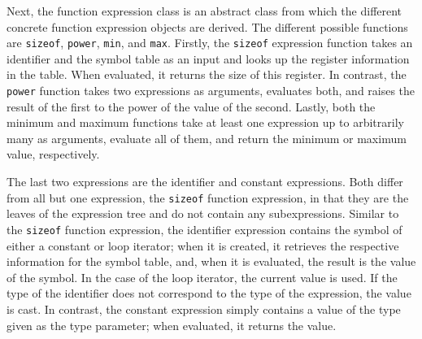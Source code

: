 Next, the function expression class is an abstract class from which the different concrete function expression objects are derived. The different possible functions are \texttt{sizeof}, \texttt{power}, \texttt{min}, and \texttt{max}. Firstly, the \texttt{sizeof} expression function takes an identifier and the symbol table as an input and looks up the register information in the table. When evaluated, it returns the size of this register. In contrast, the \texttt{power} function takes two expressions as arguments, evaluates both, and raises the result of the first to the power of the value of the second. Lastly, both the minimum and maximum functions take at least one expression up to arbitrarily many as arguments, evaluate all of them, and return the minimum or maximum value, respectively.

The last two expressions are the identifier and constant expressions. Both differ from all but one expression, the \texttt{sizeof} function expression, in that they are the leaves of the expression tree and do not contain any subexpressions. Similar to the \texttt{sizeof} function expression, the identifier expression contains the symbol of either a constant or loop iterator; when it is created, it retrieves the respective information for the symbol table, and, when it is evaluated, the result is the value of the symbol. In the case of the loop iterator, the current value is used. If the type of the identifier does not correspond to the type of the expression, the value is cast. 
In contrast, the constant expression simply contains a value of the type given as the type parameter; when evaluated, it returns the value.
